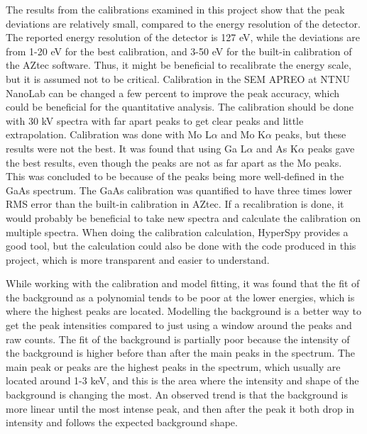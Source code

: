 The results from the calibrations examined in this project show that the peak deviations are relatively small, compared to the energy resolution of the detector.
The reported energy resolution of the detector is 127 eV, while the deviations are from 1-20 eV for the best calibration, and 3-50 eV for the built-in calibration of the AZtec software.
Thus, it might be beneficial to recalibrate the energy scale, but it is assumed not to be critical.
Calibration in the SEM APREO at NTNU NanoLab can be changed a few percent to improve the peak accuracy, which could be beneficial for the quantitative analysis.
The calibration should be done with 30 kV spectra with far apart peaks to get clear peaks and little extrapolation.
Calibration was done with Mo L$\alpha$ and Mo K$\alpha$ peaks, but these results were not the best.
It was found that using Ga L$\alpha$ and As K$\alpha$ peaks gave the best results, even though the peaks are not as far apart as the Mo peaks.
This was concluded to be because of the peaks being more well-defined in the GaAs spectrum.
The GaAs calibration was quantified to have three times lower RMS error than the built-in calibration in AZtec.
If a recalibration is done, it would probably be beneficial to take new spectra and calculate the calibration on multiple spectra.
When doing the calibration calculation, HyperSpy provides a good tool, but the calculation could also be done with the code produced in this project, which is more transparent and easier to understand.


While working with the calibration and model fitting, it was found that the fit of the background as a polynomial tends to be poor at the lower energies, which is where the highest peaks are located.
Modelling the background is a better way to get the peak intensities compared to just using a window around the peaks and raw counts.
The fit of the background is partially poor because the intensity of the background is higher before than after the main peaks in the spectrum.
The main peak or peaks are the highest peaks in the spectrum, which usually are located around 1-3 keV, and this is the area where the intensity and shape of the background is changing the most.
An observed trend is that the background is more linear until the most intense peak, and then after the peak it both drop in intensity and follows the expected background shape.


